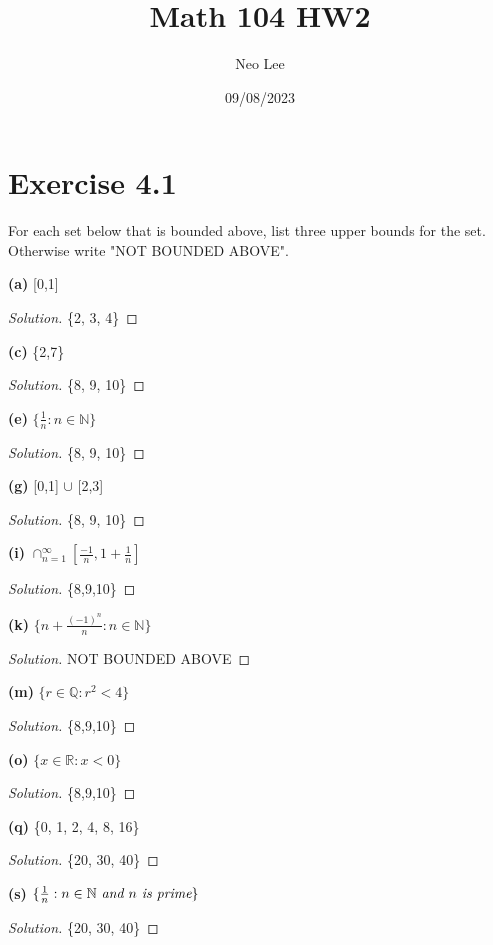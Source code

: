 \documentclass{article}
\title{Math 104 HW2}
\author{Neo Lee}
\date{09/08/2023}
\begin{document}
 

\maketitle 

\section*{Exercise 4.1}
For each set below that is bounded above, list three upper bounds for the set. Otherwise write 
"NOT BOUNDED ABOVE". 

\textbf{(a)} [0,1]
\begin{proof}[Solution]
    \{2, 3, 4\}
\end{proof}

\textbf{(c)} \{2,7\}
\begin{proof}[Solution]
    \{8, 9, 10\}
\end{proof}

\textbf{(e)} $\{\frac{1}{n}:n\in\mathbb{N}\}$
\begin{proof}[Solution]
    \{8, 9, 10\}
\end{proof}

\textbf{(g)} [0,1] $\cup$ [2,3]
\begin{proof}[Solution]
    \{8, 9, 10\}
\end{proof}

\textbf{(i)} $\cap^\infty_{n=1}\left[\frac{-1}{n}, 1+\frac{1}{n}\right]$
\begin{proof}[Solution]
    \{8,9,10\}
\end{proof}

\textbf{(k)} $\{n+\frac{(-1)^n}{n}:n\in\mathbb{N}\}$
\begin{proof}[Solution]
    NOT BOUNDED ABOVE
\end{proof}

\textbf{(m)} $\{r\in\mathbb{Q}:r^2<4\}$
\begin{proof}[Solution]
    \{8,9,10\}
\end{proof}

\textbf{(o)} $\{x\in\mathbb{R}:x<0\}$
\begin{proof}[Solution]
    \{8,9,10\}
\end{proof}

\textbf{(q)} \{0, 1, 2, 4, 8, 16\}
\begin{proof}[Solution]
    \{20, 30, 40\}
\end{proof}

\textbf{(s)} $\{\frac{1}{n}:n\in\mathbb{N} \emph{ and } n \emph{ is prime}\}$
\begin{proof}[Solution]
    \{20, 30, 40\}
\end{proof}
\end{document}
